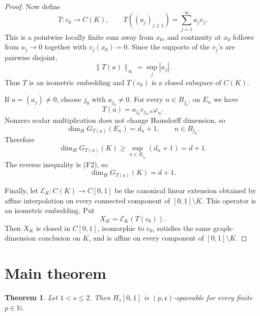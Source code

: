 \documentclass[11pt]{article}
\newtheorem*{theorem}{Theorem}
\newcommand{\cE}{\mathcal E}
\newcommand{\NN}{\mathbb N}
\newcommand{\cc}{\mathfrak c}
\newcommand{\dimH}{\dim_{\!H}}
\begin{document}
\begin{proof}
Now define
\[
T:c_0\longrightarrow C(K),\qquad
T((a_j)_{j\geq1})=\sum_{j=1}^\infty a_jv_j.
\]
This is a pointwise locally finite sum away from \(x_0\), and continuity at \(x_0\) follows from \(a_j\to0\) together with \(v_j(x_0)=0\).  Since the supports of the \(v_j\)'s are pairwise disjoint,
\[
\|T(a)\|_\infty=\sup_j |a_j|.
\]
Thus \(T\) is an isometric embedding and \(T(c_0)\) is a closed subspace of \(C(K)\).

If \(a=(a_j)\neq0\), choose \(j_0\) with \(a_{j_0}\neq0\).  For every \(n\in B_{j_0}\), on \(E_n\) we have
\[
T(a)=a_{j_0}c_{j_0,n}\varphi_n.
\]
Nonzero scalar multiplication does not change Hausdorff dimension, so
\[
\dimH G_{T(a)}(E_n)=d_n+1,\qquad n\in B_{j_0}.
\]
Therefore
\[
\dimH G_{T(a)}(K)\geq
\sup_{n\in B_{j_0}}(d_n+1)=d+1.
\]
The reverse inequality is (F2), so
\[
\dimH G_{T(a)}(K)=d+1.
\]

Finally, let \(\cE_K:C(K)\to C[0,1]\) be the canonical linear extension obtained by affine interpolation on every connected component of \([0,1]\setminus K\).  This operator is an isometric embedding.  Put
\[
X_K=\cE_K(T(c_0)).
\]
Then \(X_K\) is closed in \(C[0,1]\), isomorphic to \(c_0\), satisfies the same graph-dimension conclusion on \(K\), and is affine on every component of \([0,1]\setminus K\).
\end{proof}

\section*{Main theorem}

\begin{theorem}
Let \(1<s\leq2\).  Then \(H_s[0,1]\) is \((p,\cc)\)-spaceable for every finite \(p\in\NN\).
\end{theorem}
\end{document}
